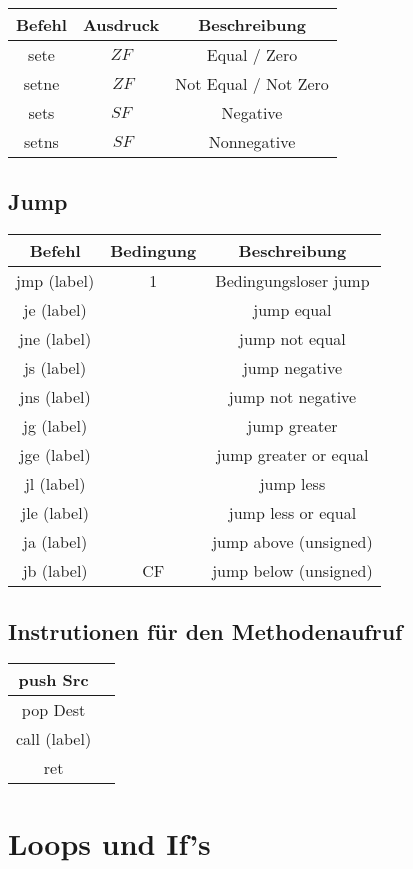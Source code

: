 \documentclass[a4paper, 11pt]{article}
\begin{document}
\begin{tabular}{|c|c|c|}
	\hline
	Befehl & Ausdruck & Beschreibung\\\hline 
	sete & $ZF$ & Equal / Zero\\\hline 
	setne & $~ZF$ & Not Equal / Not Zero\\\hline 
	sets & $SF$ & Negative\\\hline 
	setns & $~SF$ & Nonnegative\\\hline 
 
\end{tabular}

\subsection{Jump}
\begin{tabular}{|c|c|c|}
	\hline
	Befehl & Bedingung & Beschreibung\\\hline
	jmp (label) & 1 & Bedingungsloser jump\\\hline
	je (label) & & jump equal \\\hline
	jne (label) & & jump not equal  \\\hline
	js (label) & & jump negative \\\hline
	jns (label) & & jump not negative  \\\hline
	jg (label) & & jump greater \\\hline
	jge (label) & & jump greater or equal \\\hline
	jl (label) & & jump less  \\\hline
	jle (label) & & jump less or equal \\\hline
	ja (label) & & jump above (unsigned) \\\hline
	jb (label) & CF & jump below (unsigned) \\\hline
\end{tabular}

\subsection{Instrutionen für den Methodenaufruf}
\begin{tabular}{|c|c|}
	push Src &  \\\hline
	pop Dest & \\\hline
	call (label) &  \\\hline
	ret &  \\\hline
\end{tabular}


\section{Loops und If's}
\end{document}
